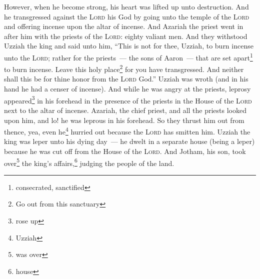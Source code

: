 \begin{inparaenum}
     However, when he become strong, his heart was lifted up unto destruction. And he transgressed against the \textsc{Lord} his God by going unto the temple of the \textsc{Lord} and offering incense upon the altar of incense.%
     And Azariah the priest went in after him with the priests of the \textsc{Lord}: eighty valiant men.%
     And they withstood Uzziah the king and said unto him, ``This is not for thee, Uzziah, to burn incense unto the \textsc{Lord}; rather for the priests~--- the sons of Aaron~--- that are set apart\footnote{consecrated, sanctified} to burn incense. Leave this holy place\footnote{Go out from this sanctuary} for you have transgressed. And neither shall this be for thine honor from the \textsc{Lord} God.''%
     Uzziah was wroth (and in his hand he had a censer of incense). And while he was angry at the priests, leprosy appeared\footnote{rose up} in his forehead in the presence of the priests in the House of the \textsc{Lord} next to the altar of incense.%
     Azariah, the chief priest, and all the priests looked upon him, and lo! he was leprous in his forehead. So they thrust him out from thence, yea, even he\footnote{Uzziah} hurried out because the \textsc{Lord} has smitten him.%
     Uzziah the king was leper unto his dying day~--- he dwelt in a separate house (being a leper) because he was cut off from the House of the \textsc{Lord}. And Jotham, his son, took over\footnote{was over} the king's affairs,\footnote{house} judging the people of the land.%
\end{inparaenum}
